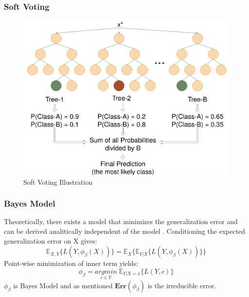 \begin{frame}
    \frametitle{Soft Voting}
    \begin{figure}
    \includegraphics[height=0.7\textheight]{images/soft.png}
    \caption{Soft Voting Illustration}
    \end{figure}
\end{frame}
\begin{frame}
    \frametitle{Bayes Model}
    Theoretically, there exists a model that minimizes the generalization error and can be derived analitically independent of the model \cite{louppe2014understanding}.
    Conditioning the expected generalization error on X gives:
    \begin{equation}
        \mathbb{E}_{X,Y} \{L(Y, \phi_{\beta}(X))\} = \mathbb{E}_{X}\{\mathbb{E}_{Y|X}\{L(Y, \phi_{\beta}(X)) \} \}
    \end{equation}
    Point-wise minimization of inner term yields:
    \begin{equation}
        \phi_{\beta} = \underset{c \in Y}{argmin} \; \mathbb{E}_{Y|X=x}\{L(Y,c)\}
    \end{equation}
    $\phi_{\beta}$ is Bayes Model and as mentioned $\boldsymbol{Err}(\phi_{\beta})$ is the irreducible error.
\end{frame}
